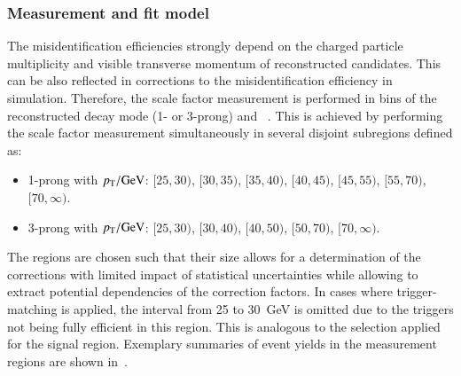

\subsubsection{Measurement and fit model}

The \jettotauhadvis misidentification efficiencies strongly depend on
the charged particle multiplicity and visible transverse momentum of
reconstructed \tauhadvis candidates. This can be also reflected in
corrections to the \jettotauhadvis misidentification efficiency in
simulation. Therefore, the scale factor measurement is performed in
bins of the reconstructed \tauhadvis decay mode (1- or 3-prong) and
\tauhadvis~\pT. This is achieved by performing the scale factor
measurement simultaneously in several disjoint subregions defined as:
\begin{itemize}

\item 1-prong \tauhadvis with $\pT / \si{\GeV}$: $[25, 30)$, $[30, 35)$,
  $[35, 40)$, $[40, 45)$, $[45, 55)$, $[55, 70)$, $[70, \infty)$.

\item 3-prong \tauhadvis with $\pT / \si{\GeV}$: $[25, 30)$, $[30, 40)$,
  $[40, 50)$, $[50, 70)$, $[70, \infty)$.

\end{itemize}
The regions are chosen such that their size allows for a determination
of the corrections with limited impact of statistical uncertainties
while allowing to extract potential \pT dependencies of the correction
factors. In cases where trigger-matching is applied, the \tauhadvis
\pT interval from 25 to \SI{30}{\GeV} is omitted due to the triggers
not being fully efficient in this region. This is analogous to the
selection applied for the \hadhad signal region. Exemplary summaries
of event yields in the measurement regions are shown
in~.

